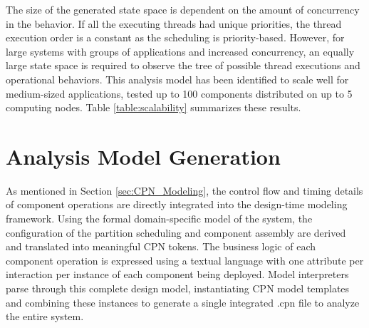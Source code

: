 The size of the generated state space is dependent on the amount of concurrency in the behavior. If all the executing threads had unique priorities, the thread execution order is a constant as the scheduling is priority-based. However, for large systems with groups of applications and increased concurrency, an equally large state space is required to observe the tree of possible thread executions and operational behaviors. This analysis model has been identified to scale well for medium-sized applications, tested up to 100 components distributed on up to 5 computing nodes. Table \ref{table:scalability} summarizes these results.

\vspace{-0.1in}

\section{Analysis Model Generation}
\label{sec:Model_Generation}

\vspace{-0.1in}

As mentioned in Section \ref{sec:CPN_Modeling}, the control flow and timing details of component operations are directly integrated into the design-time modeling framework. Using the formal domain-specific model of the system, the configuration of the partition scheduling and component assembly are derived and translated into meaningful CPN tokens. The business logic of each component operation is expressed using a textual language with one attribute per interaction per instance of each component being deployed. Model interpreters parse through this complete design model, instantiating CPN model templates and combining these instances to generate a single integrated .cpn file to analyze the entire system.


